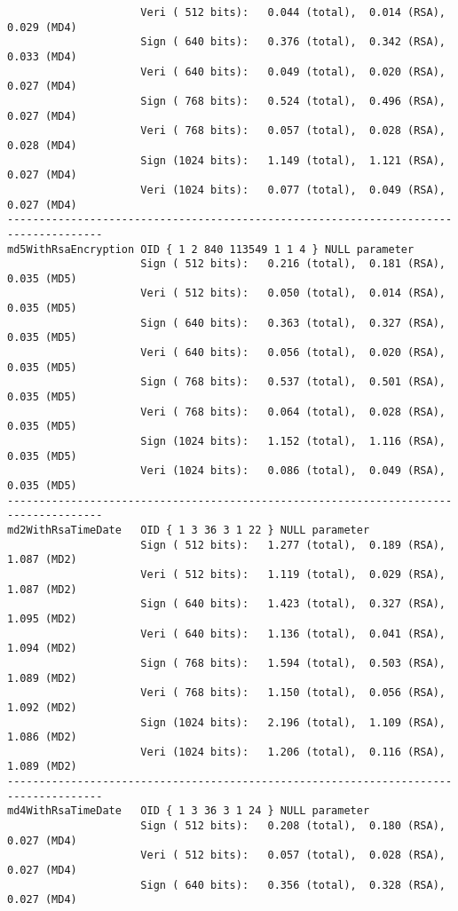 {\begin{verbatim}
                     Veri ( 512 bits):   0.044 (total),  0.014 (RSA),  0.029 (MD4)  
                     Sign ( 640 bits):   0.376 (total),  0.342 (RSA),  0.033 (MD4)  
                     Veri ( 640 bits):   0.049 (total),  0.020 (RSA),  0.027 (MD4)  
                     Sign ( 768 bits):   0.524 (total),  0.496 (RSA),  0.027 (MD4)  
                     Veri ( 768 bits):   0.057 (total),  0.028 (RSA),  0.028 (MD4)  
                     Sign (1024 bits):   1.149 (total),  1.121 (RSA),  0.027 (MD4)  
                     Veri (1024 bits):   0.077 (total),  0.049 (RSA),  0.027 (MD4)  
-------------------------------------------------------------------------------------
md5WithRsaEncryption OID { 1 2 840 113549 1 1 4 } NULL parameter
                     Sign ( 512 bits):   0.216 (total),  0.181 (RSA),  0.035 (MD5)  
                     Veri ( 512 bits):   0.050 (total),  0.014 (RSA),  0.035 (MD5)  
                     Sign ( 640 bits):   0.363 (total),  0.327 (RSA),  0.035 (MD5)  
                     Veri ( 640 bits):   0.056 (total),  0.020 (RSA),  0.035 (MD5)  
                     Sign ( 768 bits):   0.537 (total),  0.501 (RSA),  0.035 (MD5)  
                     Veri ( 768 bits):   0.064 (total),  0.028 (RSA),  0.035 (MD5)  
                     Sign (1024 bits):   1.152 (total),  1.116 (RSA),  0.035 (MD5)  
                     Veri (1024 bits):   0.086 (total),  0.049 (RSA),  0.035 (MD5)  
-------------------------------------------------------------------------------------
md2WithRsaTimeDate   OID { 1 3 36 3 1 22 } NULL parameter
                     Sign ( 512 bits):   1.277 (total),  0.189 (RSA),  1.087 (MD2)  
                     Veri ( 512 bits):   1.119 (total),  0.029 (RSA),  1.087 (MD2)  
                     Sign ( 640 bits):   1.423 (total),  0.327 (RSA),  1.095 (MD2)  
                     Veri ( 640 bits):   1.136 (total),  0.041 (RSA),  1.094 (MD2)  
                     Sign ( 768 bits):   1.594 (total),  0.503 (RSA),  1.089 (MD2)  
                     Veri ( 768 bits):   1.150 (total),  0.056 (RSA),  1.092 (MD2)  
                     Sign (1024 bits):   2.196 (total),  1.109 (RSA),  1.086 (MD2)  
                     Veri (1024 bits):   1.206 (total),  0.116 (RSA),  1.089 (MD2)  
-------------------------------------------------------------------------------------
md4WithRsaTimeDate   OID { 1 3 36 3 1 24 } NULL parameter
                     Sign ( 512 bits):   0.208 (total),  0.180 (RSA),  0.027 (MD4)  
                     Veri ( 512 bits):   0.057 (total),  0.028 (RSA),  0.027 (MD4)  
                     Sign ( 640 bits):   0.356 (total),  0.328 (RSA),  0.027 (MD4)  

\end{verbatim}}

